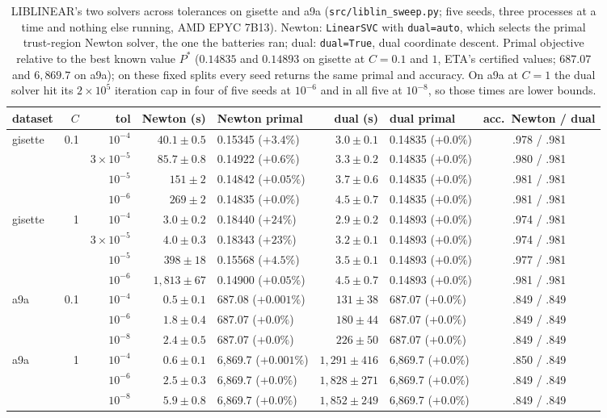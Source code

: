 \documentclass{opt2026}   %
\begin{document}
\begin{table}[h]\centering\scriptsize
\caption{LIBLINEAR's two solvers across tolerances on gisette and
a9a (\texttt{src/liblin\_sweep.py}; five seeds, three processes at a
time and nothing else running, AMD EPYC 7B13). Newton: \texttt{LinearSVC}
with \texttt{dual=\textquotesingle auto\textquotesingle}, which selects
the primal trust-region Newton solver, the one the batteries ran; dual:
\texttt{dual=True}, dual coordinate descent. Primal objective relative
to the best known value $P^*$ ($0.14835$ and $0.14893$ on gisette at
$C{=}0.1$ and $1$, ETA's certified values; $687.07$ and $6{,}869.7$ on
a9a); on these fixed splits every seed returns the same primal and
accuracy. On a9a at $C{=}1$ the dual solver hit its $2\times10^5$
iteration cap in four of five seeds at $10^{-6}$ and in all five at
$10^{-8}$, so those times are lower bounds.}\label{tab:libdef}
\begin{tabular}{lrrrlrlc}\toprule
dataset & $C$ & tol & Newton (s) & Newton primal & dual (s) & dual primal & acc.\ Newton / dual \\\midrule
gisette & 0.1 & $10^{-4}$ & $40.1\pm0.5$ & 0.15345 ($+3.4\%$) & $3.0\pm0.1$ & 0.14835 ($+0.0\%$) & .978 / .981 \\
 & & $3\times10^{-5}$ & $85.7\pm0.8$ & 0.14922 ($+0.6\%$) & $3.3\pm0.2$ & 0.14835 ($+0.0\%$) & .980 / .981 \\
 & & $10^{-5}$ & $151\pm2$ & 0.14842 ($+0.05\%$) & $3.7\pm0.6$ & 0.14835 ($+0.0\%$) & .981 / .981 \\
 & & $10^{-6}$ & $269\pm2$ & 0.14835 ($+0.0\%$) & $4.5\pm0.7$ & 0.14835 ($+0.0\%$) & .981 / .981 \\
gisette & 1 & $10^{-4}$ & $3.0\pm0.2$ & 0.18440 ($+24\%$) & $2.9\pm0.2$ & 0.14893 ($+0.0\%$) & .974 / .981 \\
 & & $3\times10^{-5}$ & $4.0\pm0.3$ & 0.18343 ($+23\%$) & $3.2\pm0.1$ & 0.14893 ($+0.0\%$) & .974 / .981 \\
 & & $10^{-5}$ & $398\pm18$ & 0.15568 ($+4.5\%$) & $3.5\pm0.1$ & 0.14893 ($+0.0\%$) & .977 / .981 \\
 & & $10^{-6}$ & $1{,}813\pm67$ & 0.14900 ($+0.05\%$) & $4.5\pm0.7$ & 0.14893 ($+0.0\%$) & .981 / .981 \\
\midrule
a9a & 0.1 & $10^{-4}$ & $0.5\pm0.1$ & 687.08 ($+0.001\%$) & $131\pm38$ & 687.07 ($+0.0\%$) & .849 / .849 \\
 & & $10^{-6}$ & $1.8\pm0.4$ & 687.07 ($+0.0\%$) & $180\pm44$ & 687.07 ($+0.0\%$) & .849 / .849 \\
 & & $10^{-8}$ & $2.4\pm0.5$ & 687.07 ($+0.0\%$) & $226\pm50$ & 687.07 ($+0.0\%$) & .849 / .849 \\
a9a & 1 & $10^{-4}$ & $0.6\pm0.1$ & 6{,}869.7 ($+0.001\%$) & $1{,}291\pm416$ & 6{,}869.7 ($+0.0\%$) & .850 / .849 \\
 & & $10^{-6}$ & $2.5\pm0.3$ & 6{,}869.7 ($+0.0\%$) & $1{,}828\pm271$ & 6{,}869.7 ($+0.0\%$) & .849 / .849 \\
 & & $10^{-8}$ & $5.9\pm0.8$ & 6{,}869.7 ($+0.0\%$) & $1{,}852\pm249$ & 6{,}869.7 ($+0.0\%$) & .849 / .849 \\
\bottomrule
\end{tabular}\end{table}
\end{document}

